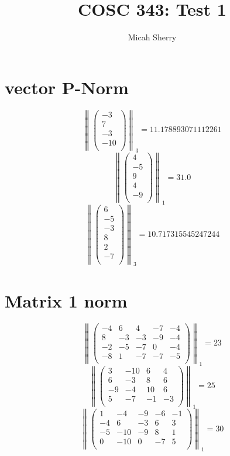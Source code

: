 \documentclass{article}
\title{COSC 343: Test 1}
\author{Micah Sherry}
\begin{document}
\maketitle

\section{vector P-Norm}
	
	$$ \left\| \begin{pmatrix}-3 \\7 \\-3 \\-10 \\\end{pmatrix}\right\|_{3} = 11.178893071112261$$
	$$ \left\| \begin{pmatrix}4 \\-5 \\9 \\4 \\-9 \\\end{pmatrix}\right\|_{1} = 31.0$$
	$$ \left\| \begin{pmatrix}6 \\-5 \\-3 \\8 \\2 \\-7 \\\end{pmatrix}\right\|_{3} = 10.717315545247244$$
\section{Matrix 1 norm}
	
	$$ \left\| \begin{pmatrix}-4 & 6 & 4 & -7 & -4 \\8 & -3 & -3 & -9 & -4 \\-2 & -5 & -7 & 0 & -4 \\-8 & 1 & -7 & -7 & -5 \\\end{pmatrix}\right\|_{1} = 23$$
	$$ \left\| \begin{pmatrix}3 & -10 & 6 & 4 \\6 & -3 & 8 & 6 \\-9 & -4 & 10 & 6 \\5 & -7 & -1 & -3 \\\end{pmatrix}\right\|_{1} = 25$$
	$$ \left\| \begin{pmatrix}1 & -4 & -9 & -6 & -1 \\-4 & 6 & -3 & 6 & 3 \\-5 & -10 & -9 & 8 & 1 \\0 & -10 & 0 & -7 & 5 \\\end{pmatrix}\right\|_{1} = 30$$
	
\end{document}
